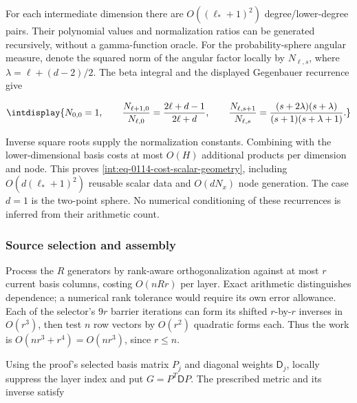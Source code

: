 
For each intermediate dimension there are \(O((\ell_*+1)^2)\) degree/lower-degree pairs. Their polynomial values and normalization ratios can be generated recursively, without a gamma-function oracle. For the probability-sphere angular measure, denote the squared norm of the angular factor locally by \(N_{\ell,\allowbreak s}\), where \(\lambda=\ell+(d-2)/2\). The beta integral and the displayed Gegenbauer recurrence give


\begingroup\renewcommand{\theHequation}{intdisplay.836}
\begin{equation*}
\intdisplay{
N_{0,0}=1,\qquad
\frac{N_{\ell+1,0}}{N_{\ell,0}}
 =\frac{2\ell+d-1}{2\ell+d},\qquad
\frac{N_{\ell,s+1}}{N_{\ell,s}}
 =\frac{(s+2\lambda)(s+\lambda)}
 {(s+1)(s+\lambda+1)}.
}
\end{equation*}
\endgroup


Inverse square roots supply the normalization constants. Combining with the lower-dimensional basis costs at most \(O(H)\) additional products per dimension and node. This proves \eqref{int:eq-0114-cost-scalar-geometry}, including \(O(d(\ell_*+1)^2)\) reusable scalar data and \(O(dN_x)\) node generation. The case \(d=1\) is the two-point sphere. No numerical conditioning of these recurrences is inferred from their arithmetic count.


\subsubsection{Source selection and assembly}



Process the \(R\) generators by rank-aware orthogonalization against at most \(r\) current basis columns, costing \(O(nRr)\) per layer. Exact arithmetic distinguishes dependence; a numerical rank tolerance would require its own error allowance. Each of the selector's \(9r\) barrier iterations can form its shifted \(r\)-by-\(r\) inverses in \(O(r^3)\), then test \(n\) row vectors by \(O(r^2)\) quadratic forms each. Thus the work is \(O(nr^3+r^4)=O(nr^3)\), since \(r\le n\).



Using the proof's selected basis matrix \(P_j\) and diagonal weights \(\mathsf D_j\), locally suppress the layer index and put \(G=P^T\mathsf DP\). The prescribed metric and its inverse satisfy


